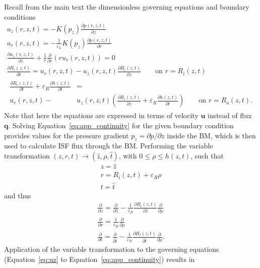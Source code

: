 \documentclass{frontiers_suppmat} %
\newcommand{\dd}{\partial}
\newcommand{\vareps}{\varepsilon}
\newcommand{\ra}{\rightarrow}
\newcommand{\hatz}{\hat{z}}
\newcommand{\hatt}{\hat{t}}
\begin{document}
Recall from the main text the dimensionless governing equations and boundary conditions
\begin{gather}
u_z(r,z,t) = -K(p_z) \frac{\dd p(r,z,t)}{\dd z}\label{eq:uz}\\
u_r(r,z,t) = - \frac{1}{\vareps_L} K(p_z) \frac{\dd p(r,z,t)}{\dd r}\\
\frac{\dd u_z(r,z,t)}{\dd z} + \frac{1}{r} \frac{\dd}{\dd r} \left( ru_r(r,z,t) \right) = 0\label{eq:app_continuity}\\
\frac{\dd R_i(z,t)}{\dd t} = u_r(r,z,t) - u_z(r,z,t) \frac{\dd R_i(z,t)}{\dd z} \qquad \text{on } r = R_i(z,t)\label{eq:ri}\\
\begin{split}
\frac{\dd R_i(z,t)}{\dd t} + \vareps_R \frac{\dd h(z,t)}{\dd t} &=\\
u_r(r,z,t) -& u_z(r,z,t) \left( \frac{\dd R_i(z,t)}{\dd z} + \vareps_R \frac{\dd h(z,t)}{\dd t} \right) \qquad \text{on } r = R_o(z,t).\label{eq:ro}
\end{split}
\end{gather}
Note that here the equations are expressed in terms of velocity $\boldsymbol{u}$ instead of flux $\boldsymbol{q}$. Solving Equation~\ref{eq:app_continuity} for the given boundary condition provides values for the pressure gradient $p_z = \dd p/\dd z$ inside the BM, which is then used to calculate ISF flux through the BM. Performing the variable transformation $(z, r, t) \ra (\hatz, \rho, \hatt)$, with $0 \leq \rho \leq h(z,t)$, such that
\begin{gather*}
z = \hatz\\
r = R_i(z,t) + \vareps_R \rho\\
t = \hatt
\end{gather*}
and thus
\begin{gather*}
\frac{\dd}{\dd z} = \frac{\dd}{\dd \hatz} - \frac{1}{\vareps_R} \frac{\dd R_i(z,t)}{\dd \hatz} \frac{\dd}{\dd \rho}\\
\frac{\dd}{\dd r} = \frac{1}{\vareps_R} \frac{\dd}{\dd \rho}\\
\frac{\dd}{\dd t} = \frac{\dd}{\dd \hatt} - \frac{1}{\vareps_R} \frac{\dd R_i(z,t)}{\dd \hatt} \frac{\dd}{\dd \rho}.
\end{gather*}
Application of the variable transformation to the governing equations (Equation~\ref{eq:uz} to Equation~\ref{eq:app_continuity}) results in
\end{document}
